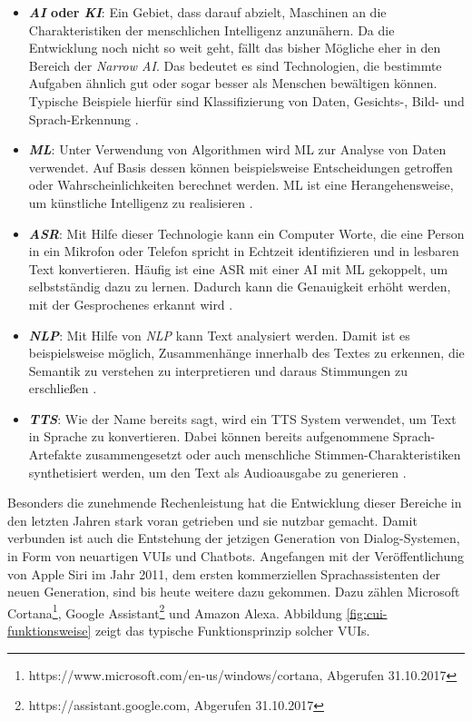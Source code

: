 \begin{itemize}
\item\textbf{\textit{\ac{AI}} oder \textit{\ac{KI}}}: Ein Gebiet, dass darauf abzielt, Maschinen an die Charakteristiken der menschlichen Intelligenz anzunähern. Da die Entwicklung noch nicht so weit geht, fällt das bisher Mögliche eher in den Bereich der \textit{Narrow AI}. Das bedeutet es sind Technologien, die bestimmte Aufgaben ähnlich gut oder sogar besser als Menschen bewältigen können. Typische Beispiele hierfür sind Klassifizierung von Daten, Gesichts-, Bild- und Sprach-Erkennung \cite{pereira-ai}\cite{copeland_difference_2016}. 
\item\textbf{\textit{\ac{ML}}}: Unter Verwendung von Algorithmen wird \ac{ML} zur Analyse von Daten verwendet. Auf Basis dessen können beispielsweise Entscheidungen getroffen oder Wahrscheinlichkeiten berechnet werden. \ac{ML} ist eine Herangehensweise, um künstliche Intelligenz zu realisieren \cite{camastra-ml}\cite{copeland_difference_2016}.
\item\textbf{\textit{\ac{ASR}}}: Mit Hilfe dieser Technologie kann ein Computer Worte, die eine Person in ein Mikrofon oder Telefon spricht in Echtzeit identifizieren und in lesbaren Text konvertieren. Häufig ist eine \ac{ASR} mit einer \ac{AI} \bzw mit \ac{ML} gekoppelt, um selbstständig dazu zu lernen. Dadurch kann die Genauigkeit erhöht werden, mit der Gesprochenes erkannt wird \cite{dong-asr}.
\item\textbf{\textit{\ac{NLP}}}: Mit Hilfe von \textit{\ac{NLP}} kann Text analysiert werden. Damit ist es beispielsweise möglich, Zusammenhänge innerhalb des Textes zu erkennen, die Semantik zu verstehen \bzw zu interpretieren und daraus Stimmungen zu erschließen \cite{biemann-nlp}. 
\item\textbf{\textit{\ac{TTS}}}: Wie der Name bereits sagt, wird ein \ac{TTS} System verwendet, um Text in Sprache zu konvertieren. Dabei können bereits aufgenommene Sprach-Artefakte zusammengesetzt oder auch menschliche Stimmen-Charakteristiken synthetisiert werden, um den Text als Audioausgabe zu generieren \cite{rao-tts}. 
\end{itemize}

Besonders die zunehmende Rechenleistung hat die Entwicklung dieser Bereiche in den letzten Jahren stark voran getrieben und sie nutzbar gemacht. Damit verbunden ist auch die Entstehung der jetzigen Generation von Dialog-Systemen, in Form von neuartigen \acp{VUI} und Chatbots. Angefangen mit der Veröffentlichung von Apple Siri im Jahr 2011, dem ersten kommerziellen Sprachassistenten der neuen Generation, sind bis heute weitere dazu gekommen. Dazu zählen \ua Microsoft Cortana\footnote{https://www.microsoft.com/en-us/windows/cortana, Abgerufen 31.10.2017}, Google Assistant\footnote{https://assistant.google.com, Abgerufen 31.10.2017} und Amazon Alexa. Abbildung \ref{fig:cui-funktionsweise} zeigt das typische Funktionsprinzip solcher \acp{VUI}.

